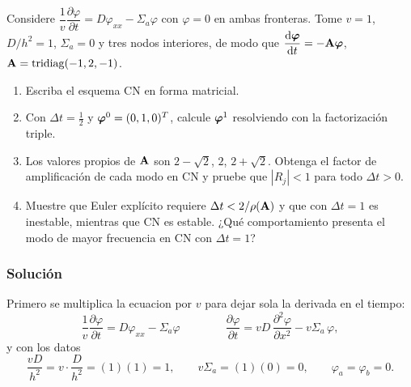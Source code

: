 
\begin{enunciado}
Considere $\dfrac{1}{v}\dfrac{\partial\varphi}{\partial t} = D\varphi_{xx} - \Sigma_a\varphi$ con
$\varphi = 0$ en ambas fronteras. Tome $v = 1$, $D/h^2 = 1$, $\Sigma_a = 0$ y tres nodos interiores,
de modo que $\dfrac{\mathrm{d}\bm{\varphi}}{\mathrm{d} t} = -\mathbf{A}\bm{\varphi}$, $\mathbf{A} = \operatorname{tridiag}(-1, 2, -1)$.
\begin{enumerate}[label=(\alph*)]
  \item Escriba el esquema CN en forma matricial.
  \item Con $\Delta t = \tfrac12$ y $\bm{\varphi}^0 = (0, 1, 0)^T$, calcule $\bm{\varphi}^1$
        resolviendo con la factorización triple.
  \item Los valores propios de $\mathbf{A}$ son $2 - \sqrt2$, $2$, $2 + \sqrt2$. Obtenga el factor de
        amplificación de cada modo en CN y pruebe que $|R_j| < 1$ para todo $\Delta t > 0$.
  \item Muestre que Euler explícito requiere $\Delta t < 2/\rho(\mathbf{A})$ y que con $\Delta t = 1$ es
        inestable, mientras que CN es estable. ¿Qué comportamiento presenta el modo de mayor
        frecuencia en CN con $\Delta t = 1$?
\end{enumerate}
\end{enunciado}

\subsubsection*{Solución}

Primero se multiplica la ecuacion por $v$ para dejar sola la derivada en el tiempo:
\[
  \frac{1}{v}\frac{\partial\varphi}{\partial t} = D\varphi_{xx} - \Sigma_a\varphi
  \quad
  \quad
  \quad
  \quad
  \frac{\partial\varphi}{\partial t} = vD\,\frac{\partial^2\varphi}{\partial x^2} - v\Sigma_a\,\varphi ,
\]
y con los datos
\[
  \frac{vD}{h^2} = v\cdot\frac{D}{h^2} = (1)(1) = 1, \qquad
  v\Sigma_a = (1)(0) = 0, \qquad
  \varphi_a = \varphi_b = 0 .
\]


